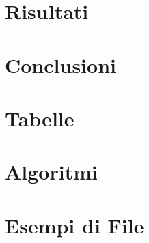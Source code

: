 \documentclass[a4paper,12pt, oneside]{book}
\begin{document}




%








\chapter{Risultati}

%




\chapter{Conclusioni}





\appendix
\chapter{Tabelle}

\chapter{Algoritmi}

\chapter{Esempi di File}



\end{document}
